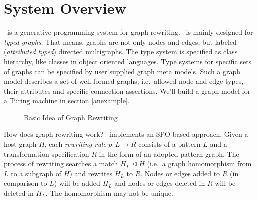 \chapter{System Overview}

\GrG\ is a generative programming system for graph rewriting. \GrG\ is mainly designed for \emph{typed graphs}.  That means, graphs are not only nodes and edges, but labeled (\emph{attributed typed}) directed multigraphs. The type system is specified as class hierarchy, like classes in object oriented languages. Type systems for specific sets of graphs can be specified by user supplied graph meta models. Such a graph model describes a set of well-formed graphs, i.e.\ allowed node and edge types, their attributes and specific connection assertions. We'll build a graph model for a Turing machine in section \ref{anexample}.

\begin{figure}[htbp]
	\centering
  \caption{Basic Idea of Graph Rewriting}
  \label{figrule}
\end{figure}

How does graph rewriting work? \GrG\ implements an SPO-based approach. Given a host graph $H$, each \emph{rewriting rule} $p: L \longrightarrow R$ consists of a pattern $L$ and a transformation specification $R$ in the form of an adopted pattern graph. The process of rewriting searches a match $H_L \unlhd H$ (i.e.\ a graph homomorphism from $L$ to a subgraph of $H$) and rewrites $H_L$ to $R$. Nodes or edges added to $R$ (in comparison to $L$) will be added $H_L$ and nodes or edges deleted in $R$ will be deleted in $H_L$. The homomorphism may not be unique.

